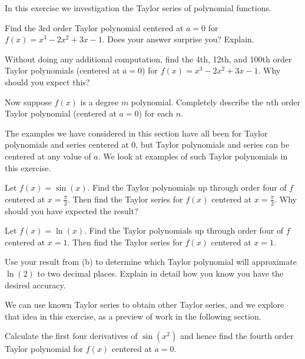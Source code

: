 \begin{exercises}
\item In this exercise we investigation the Taylor series of polynomial functions.
    \ba
    \item Find the 3rd order Taylor polynomial centered at $a = 0$ for $f(x) = x^3-2x^2+3x-1$. Does your answer surprise you? Explain.

    \item Without doing any additional computation, find the 4th, 12th, and 100th order Taylor polynomials (centered at $a = 0$) for $f(x) = x^3-2x^2+3x-1$. Why should you expect this?

    \item Now suppose $f(x)$ is a degree $m$ polynomial. Completely describe the $n$th order Taylor polynomial (centered at $a = 0$) for each $n$.

    \ea


\item The examples we have considered in this section have all been for Taylor polynomials and series centered at 0, but Taylor polynomials and series can be centered at any value of $a$. We look at examples of such Taylor polynomials in this exercise.
    \ba
    \item Let $f(x) = \sin(x)$. Find the Taylor polynomials up through order four of $f$ centered at $x = \frac{\pi}{2}$. Then find the Taylor series for $f(x)$ centered at $x = \frac{\pi}{2}$. Why should you have expected the result?

    \item Let $f(x) = \ln(x)$. Find the Taylor polynomials up through order four of $f$ centered at $x = 1$. Then find the Taylor series for $f(x)$ centered at $x = 1$.

    \item Use your result from (b) to determine which Taylor polynomial will approximate $\ln(2)$ to two decimal places. Explain in detail how you know you have the desired accuracy.

    \ea


\item We can use known Taylor series to obtain other Taylor series, and we explore that idea in this exercise, as a preview of work in the following section.
    \ba
    \item Calculate the first four derivatives of $\sin(x^2)$ and hence find the fourth order Taylor polynomial for $f(x)$ centered at $a=0$.


\end{exercises}
